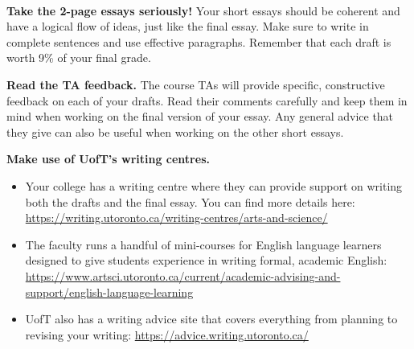 \documentclass[12pt]{article}
\def\mydot{\textcolor{deepblue}{\rule{1ex}{1ex}}}
\newlength\sidebarwidth
\newcommand{\topic}[3][]%
	 {\pagebreak[2]%
	 \vspace{.2cm}
	 \begin{minipage}{\textwidth}
         \phantomsection\addcontentsline{toc}{section}{#1}%
         \nopagebreak\hspace{0in}%
         \nopagebreak\begin{minipage}[t]{\sidebarwidth - .2cm}
         \raggedleft \bf\sc 
	 \color{myblue}{\large #2}
	 \end{minipage}%
	 \hfill
	 \begin{minipage}[t]{\linewidth - \sidebarwidth}
	 \nopagebreak{\color{myblue}%
		    \rule{0pt}{\baselineskip}%
		    \rule{\linewidth}{2.5pt}%
		    \llap{\raisebox{.3\baselineskip}{\sf #1}}%
		    \vspace*{.1\baselineskip}%
		    }%
	 #3%
	 \end{minipage}
	 \end{minipage}}
\newenvironment{mywidth}{\begin{adjustwidth}{\sidebarwidth}{}}{\end{adjustwidth}}
\begin{document}
	\topic{Advice}{~}
	\begin{mywidth}
		\textbf{Take the 2-page essays seriously!}
		Your short essays should be coherent and have a logical flow of ideas, just like the final essay. Make sure to write in complete sentences and use effective paragraphs. Remember that each draft is worth 9\% of your final grade.
		
		\textbf{Read the TA feedback.} 
		The course TAs will provide specific, constructive feedback on each of your drafts. Read their comments carefully and keep them in mind when working on the final version of your essay. Any general advice that they give can also be useful when working on the other short essays.
		
		\textbf{Make use of UofT’s writing centres.}
		\begin{itemize}[leftmargin=1cm, itemsep=0ex, parsep=.5ex, labelindent=-4ex, label={\mydot}]
			\item Your college has a writing centre where they can provide support on writing both the drafts and the final essay. You can find more details here: \\\url{https://writing.utoronto.ca/writing-centres/arts-and-science/}
			\item The faculty runs a handful of mini-courses for English language learners designed to give students experience in writing formal, academic English:
			\url{https://www.artsci.utoronto.ca/current/academic-advising-and-support/english-language-learning}
			\item UofT also has a writing advice site that covers everything from planning to revising your writing: \url{https://advice.writing.utoronto.ca/}
		\end{itemize}
	\end{mywidth}
\end{document}
